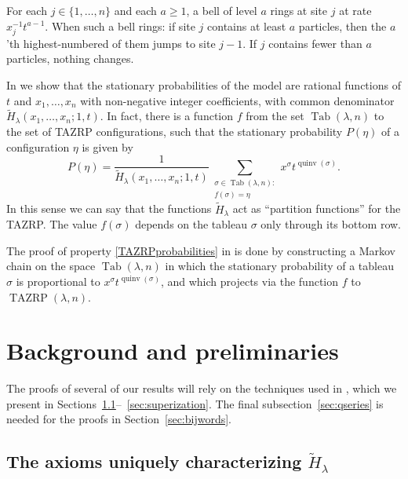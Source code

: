 \documentclass[ALCO,Unicode]{cedram}
\DeclareMathOperator{\PQT}{Tab}
\DeclareMathOperator{\quinv}{quinv}
\DeclareMathOperator{\TAZRP}{TAZRP}
\begin{document}
For each $j\in\{1,\dots,n\}$ and each $a\geq 1$, a bell of level $a$ rings at site $j$ at rate
$x_j^{-1} t^{a-1}$. 
When such a bell rings: if site $j$ contains at least $a$ particles, 
then the $a$'th highest-numbered of them jumps to site $j-1$. If $j$ contains fewer
than $a$ particles, nothing changes. 


In \cite{AMM22} we show that 
the stationary probabilities of the model are rational functions of 
$t$ and $x_1, \dots, x_n$ with non-negative integer coefficients, with 
common denominator
$\widetilde{H}_{\lambda}(x_1,\ldots,x_n;1,t)$. 
In fact, there is a function $f$ from the set $\PQT(\lambda, n)$
to the set of TAZRP configurations, 
such that the stationary probability $P(\eta)$ of a configuration $\eta$ is given 
by
\begin{equation}\label{TAZRPprobabilities}
P(\eta)=
\frac{1}{
\widetilde{H}_{\lambda}(x_1,\ldots,x_n;1,t)
}
{
\sum_{
\substack{
\sigma\in\PQT(\lambda,n): 
\\
f(\sigma)=\eta
}
}
x^\sigma t^{\quinv(\sigma)}
}.
\end{equation}
In this sense we can say that the functions $\widetilde{H}_{\lambda}$ 
act as  ``partition functions'' for the TAZRP.
The value $f(\sigma)$ depends on the tableau $\sigma$ only through its bottom row. 

The proof of property \eqref{TAZRPprobabilities} in \cite{AMM22} is done by constructing a Markov chain on the space $\PQT(\lambda, n)$ in which the stationary probability of a tableau $\sigma$ is proportional to $x^\sigma t^{\quinv(\sigma)}$, and which projects via the function $f$ to $\TAZRP(\lambda,n)$. 


\section{Background and preliminaries}
\label{sec:background}

The proofs of several of our results will rely on the techniques used in \cite{HHL05}, which we present in Sections~\ref{sec:axioms}--~\ref{sec:superization}. The final subsection~\ref{sec:qseries} is needed for the proofs in Section~\ref{sec:bijwords}.

\subsection{The axioms uniquely characterizing $\widetilde{H}_{\lambda}$}\label{sec:axioms}
\end{document}
